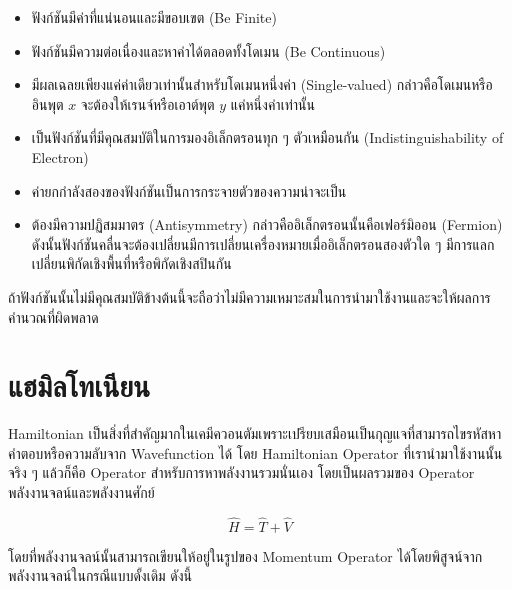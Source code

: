 \begin{itemize}[topsep=0pt,noitemsep]\setlength\itemsep{0.5em}
    \item ฟังก์ชันมีค่าที่แน่นอนและมีขอบเขต (Be Finite)

    \item ฟังก์ชันมีความต่อเนื่องและหาค่าได้ตลอดทั้งโดเมน (Be Continuous)

    \item มีผลเฉลยเพียงแค่ค่าเดียวเท่านั้นสำหรับโดเมนหนึ่งค่า (Single-valued) กล่าวคือโดเมนหรืออินพุต $x$ จะต้องให้เรนจ์หรือเอาต์พุต
          $y$ แค่หนึ่งค่าเท่านั้น

    \item เป็นฟังก์ชันที่มีคุณสมบัติในการมองอิเล็กตรอนทุก ๆ ตัวเหมือนกัน (Indistinguishability of Electron)

    \item ค่ายกกำลังสองของฟังก์ชันเป็นการกระจายตัวของความน่าจะเป็น

    \item ต้องมีความปฏิสมมาตร (Antisymmetry) กล่าวคืออิเล็กตรอนนั้นคือเฟอร์มิออน (Fermion)\autocite{atkins2010}
          ดังนั้นฟังก์ชันคลื่นจะต้องเปลี่ยนมีการเปลี่ยนเครื่องหมายเมื่ออิเล็กตรอนสองตัวใด ๆ มีการแลกเปลี่ยนพิกัดเชิงพื้นที่หรือพิกัดเชิงสปินกัน
\end{itemize}

ถ้าฟังก์ชันนั้นไม่มีคุณสมบัติข้างต้นนี้จะถือว่าไม่มีความเหมาะสมในการนำมาใช้งานและจะให้ผลการคำนวณที่ผิดพลาด

\section{แฮมิลโทเนียน}
\label{sec:hamiltonian}

Hamiltonian เป็นสิ่งที่สำคัญมากในเคมีควอนตัมเพราะเปรียบเสมือนเป็นกุญแจที่สามารถไขรหัสหาคำตอบหรือความลับจาก Wavefunction ได้
โดย Hamiltonian Operator ที่เรานำมาใช้งานนั้นจริง ๆ แล้วก็คือ Operator สำหรับการหาพลังงานรวมนั่นเอง โดยเป็นผลรวมของ Operator
พลังงานจลน์และพลังงานศักย์

\begin{equation}\label{eq:hamil}
    \hat{H} = \hat{T} + \hat{V}
\end{equation}

\noindent โดยที่พลังงานจลน์นั้นสามารถเขียนให้อยู่ในรูปของ Momentum Operator ได้โดยพิสูจน์จากพลังงานจลน์ในกรณีแบบดั้งเดิม ดังนี้

